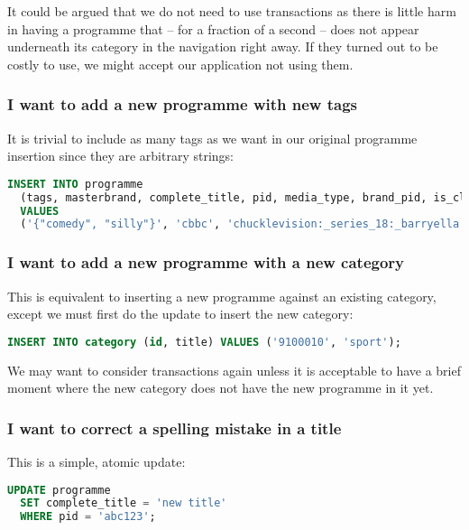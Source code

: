 \documentclass[11pt,a4paper]{article}
\begin{document}
It could be argued that we do not need to use transactions as there is
little harm in having a programme that -- for a fraction of a second --
does not appear underneath its category in the navigation right away. If
they turned out to be costly to use, we might accept our application
not using them.

\subsubsection{I want to add a new programme with new tags}

It is trivial to include as many tags as we want in our original programme
insertion since they are arbitrary strings:

\begin{lstlisting}[language=SQL]
  INSERT INTO programme
  (tags, masterbrand, complete_title, pid, media_type, brand_pid, is_clip)
  VALUES
  ('{"comedy", "silly"}', 'cbbc', 'chucklevision:_series_18:_barryella', 'b0079214', 'video', 'b006w487', '0');
\end{lstlisting}

\subsubsection{I want to add a new programme with a new category}

This is equivalent to inserting a new programme against an existing category,
except we must first do the update to insert the new category:

\begin{lstlisting}[language=SQL]
  INSERT INTO category (id, title) VALUES ('9100010', 'sport');
\end{lstlisting}

We may want to consider transactions again unless it is acceptable
to have a brief moment where the new category does not have the new
programme in it yet.

\subsubsection{I want to correct a spelling mistake in a title}

This is a simple, atomic update:

\begin{lstlisting}[language=SQL]
  UPDATE programme
  SET complete_title = 'new title'
  WHERE pid = 'abc123';
\end{lstlisting}
\end{document}
